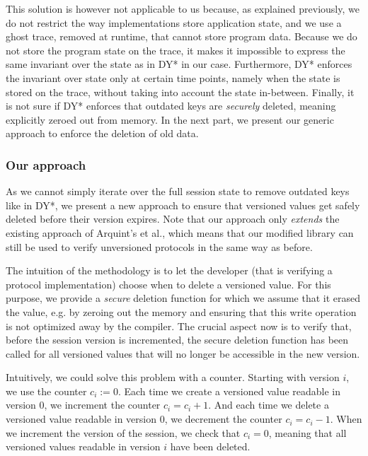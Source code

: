 This solution is however not applicable to us because, as explained previously, we do not restrict the way implementations store application state, and we use a ghost trace, removed at runtime, that cannot store program data.
Because we do not store the program state on the trace, it makes it impossible to express the same invariant over the state as in DY* in our case.
Furthermore, DY* enforces the invariant over state only at certain time points, namely when the state is stored on the trace, without taking into account the state in-between.
Finally, it is not sure if DY* enforces that outdated keys are \emph{securely} deleted, meaning explicitly zeroed out from memory.
In the next part, we present our generic approach to enforce the deletion of old data.

\subsubsection{Our approach}
\label{sec:our-approach}

As we cannot simply iterate over the full session state to remove outdated keys like in DY*, we present a new approach to ensure that versioned values get safely deleted before their version expires.
Note that our approach only \emph{extends} the existing approach of Arquint's et al., which means that our modified library can still be used to verify unversioned protocols in the same way as before.

The intuition of the methodology is to let the developer (that is verifying a protocol implementation) choose when to delete a versioned value.
For this purpose, we provide a \emph{secure} deletion function for which we assume that it erased the value, e.g. by zeroing out the memory and ensuring that this write operation is not optimized away by the compiler.
The crucial aspect now is to verify that, before the session version is incremented, the secure deletion function has been called for all versioned values that will no longer be accessible in the new version.

Intuitively, we could solve this problem with a counter. Starting with version $i$, we use the counter $c_i:=0$.
Each time we create a versioned value readable in version $0$, we increment the counter $c_i = c_i + 1$.
And each time we delete a versioned value readable in version $0$, we decrement the counter $c_i = c_i - 1$.
When we increment the version of the session, we check that $c_i = 0$, meaning that all versioned values readable in version $i$ have been deleted.

